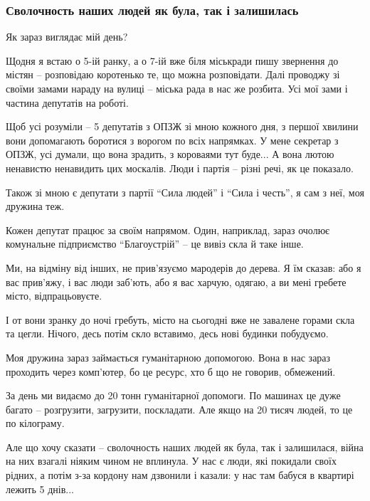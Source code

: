  
 
 
 
 
\subsubsection{Сволочность наших людей як була, так і залишилась}

Як зараз виглядає мій день?

Щодня я встаю о 5-ій ранку, а о 7-ій вже біля міськради пишу звернення до
містян – розповідаю коротенько те, що можна розповідати. Далі проводжу зі
своїми замами нараду на вулиці – міська рада в нас же розбита. Усі мої зами і
частина депутатів на роботі. 

Щоб усі розуміли – 5 депутатів з ОПЗЖ зі мною кожного дня, з першої хвилини
вони допомагають боротися з ворогом по всіх напрямках. У мене секретар з ОПЗЖ,
усі думали, що вона зрадить, з короваями тут буде... А вона лютою ненавистю
ненавидить цих москалів. Люди і партія – різні речі, як це показало. 

Також зі мною є депутати з партії \enquote{Сила людей} і \enquote{Сила і честь}, я сам з неї,
моя дружина теж.

Кожен депутат працює за своїм напрямом. Один, наприклад, зараз очолює
комунальне підприємство \enquote{Благоустрій} – це вивіз скла й таке інше. 

Ми, на відміну від інших, не прив'язуємо мародерів до дерева. Я їм сказав: або
я вас прив'яжу, і вас люди заб'ють, або я вас харчую, одягаю, а ви мені гребете
місто, відпрацьовуєте.

І от вони зранку до ночі гребуть, місто на сьогодні вже не завалене горами скла
та цегли. Нічого, десь потім скло вставимо, десь нові будинки побудуємо.

Моя дружина зараз займається гуманітарною допомогою. Вона в нас зараз проходить
через комп'ютер, бо це ресурс, хто б що не говорив, обмежений.

За день ми видаємо до 20 тонн гуманітарної допомоги. По машинах це дуже багато
– розгрузити, загрузити, поскладати. Але якщо на 20 тисяч людей, то це по
кілограму. 

Але що хочу сказати – сволочность наших людей як була, так і залишилася, війна
на них взагалі ніяким чином не вплинула. У нас є люди, які покидали своїх
рідних, а потім з-за кордону нам дзвонили і казали: у нас там бабуся в квартирі
лежить 5 днів... 

